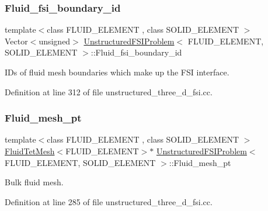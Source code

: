 \subsubsection{\texorpdfstring{Fluid\+\_\+fsi\+\_\+boundary\+\_\+id}{Fluid\_fsi\_boundary\_id}}
{\footnotesize\ttfamily template$<$class F\+L\+U\+I\+D\+\_\+\+E\+L\+E\+M\+E\+NT , class S\+O\+L\+I\+D\+\_\+\+E\+L\+E\+M\+E\+NT $>$ \\
Vector$<$unsigned$>$ \hyperlink{classUnstructuredFSIProblem}{Unstructured\+F\+S\+I\+Problem}$<$ F\+L\+U\+I\+D\+\_\+\+E\+L\+E\+M\+E\+NT, S\+O\+L\+I\+D\+\_\+\+E\+L\+E\+M\+E\+NT $>$\+::Fluid\+\_\+fsi\+\_\+boundary\+\_\+id\hspace{0.3cm}{\ttfamily [private]}}



I\+Ds of fluid mesh boundaries which make up the F\+SI interface. 



Definition at line 312 of file unstructured\+\_\+three\+\_\+d\+\_\+fsi.\+cc.

\mbox{\label{classUnstructuredFSIProblem_a7892a7d7fd6aeff9f7a391b70bab9c81}} 
\subsubsection{\texorpdfstring{Fluid\+\_\+mesh\+\_\+pt}{Fluid\_mesh\_pt}}
{\footnotesize\ttfamily template$<$class F\+L\+U\+I\+D\+\_\+\+E\+L\+E\+M\+E\+NT , class S\+O\+L\+I\+D\+\_\+\+E\+L\+E\+M\+E\+NT $>$ \\
\hyperlink{classFluidTetMesh}{Fluid\+Tet\+Mesh}$<$F\+L\+U\+I\+D\+\_\+\+E\+L\+E\+M\+E\+NT$>$$\ast$ \hyperlink{classUnstructuredFSIProblem}{Unstructured\+F\+S\+I\+Problem}$<$ F\+L\+U\+I\+D\+\_\+\+E\+L\+E\+M\+E\+NT, S\+O\+L\+I\+D\+\_\+\+E\+L\+E\+M\+E\+NT $>$\+::Fluid\+\_\+mesh\+\_\+pt\hspace{0.3cm}{\ttfamily [private]}}



Bulk fluid mesh. 



Definition at line 285 of file unstructured\+\_\+three\+\_\+d\+\_\+fsi.\+cc.

\mbox{\label{classUnstructuredFSIProblem_a1ae2785eef94e3ba41fe5562a4a32c8d}} 
